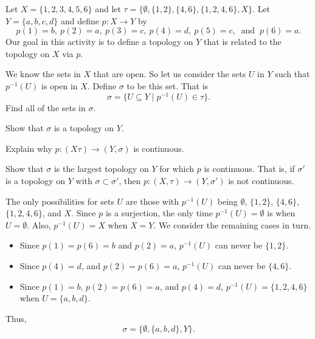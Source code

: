 \begin{pa} Let $X = \{1,2,3,4,5,6\}$ and let $\tau = \{\emptyset, \{1,2\},\{4,6\}, \{1,2,4,6\},X\}$. Let $Y = \{a,b,c,d\}$ and define $p: X \to Y$ by 
\[p(1) = b, \ p(2) = a, \ p(3) = c, \ p(4) = d, \ p(5) = c, \ \text{ and } \ p(6) = a.\] 
Our goal in this activity is to define a topology on $Y$ that is related to the topology on $X$ via $p$. 
\ba
\item We know the sets in $X$ that are open. So let us consider the sets $U$ in $Y$ such that $p^{-1}(U)$ is open in $X$. Define $\sigma$ to be this set. That is
\[\sigma = \{U \subseteq Y \mid p^{-1}(U) \in \tau\}.\]
Find all of the sets in $\sigma$. 

\item Show that $\sigma$ is a topology on $Y$.

\item Explain why $p : (X\tau) \to (Y, \sigma)$ is continuous.

\item Show that $\sigma$ is the largest topology on $Y$ for which $p$ is continuous. That is, if $\sigma'$ is a topology on $Y$ with $\sigma \subset \sigma'$, then $p: (X,\tau) \to (Y, \sigma')$ is not continuous.

\ea

\end{pa}


\ActivitySolution

\ba
\item The only possibilities for sets $U$ are those with $p^{-1}(U)$ being $\emptyset$, $\{1,2\}$, $\{4,6\}$, $\{1,2,4,6\}$, and $X$. Since $p$ is a surjection, the only time $p^{-1}(U) = \emptyset$ is when $U = \emptyset$. Also, $p^{-1}(U) = X$ when $X = Y$. We consider the remaining cases in turn. 
\begin{itemize}
\item Since $p(1) = p(6) = b$ and $p(2) = a$, $p^{-1}(U)$ can never be  $\{1,2\}$.
\item Since $p(4) = d$, and $p(2) = p(6) = a$, $p^{-1}(U)$ can never be $\{4,6\}$. 
\item Since $p(1) = b$, $p(2) = p(6) = a$, and $p(4) = d$, $p^{-1}(U) = \{1,2,4,6\}$ when $U = \{a,b,d\}$. 
\end{itemize}
Thus, 
\[\sigma = \{\emptyset, \{a,b,d\}, Y\}.\]

